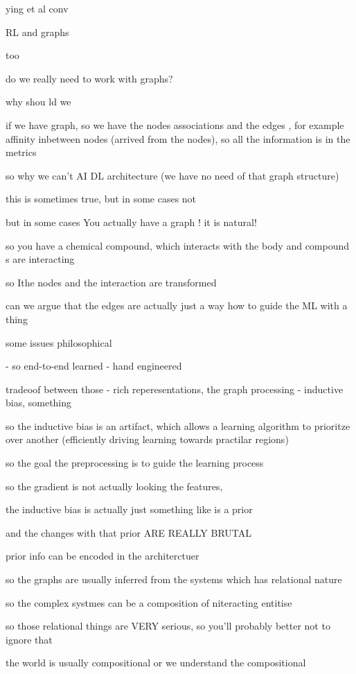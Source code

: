 \documentclass{article}
\begin{document}
ying et al conv

RL and graphs

too

do we really need to work with graphs?

why shou ld we

if we have  graph, so we have the nodes associations and the edges , for example affinity inbetween nodes (arrived from the nodes), so all the information is in the metrics



so why we can't AI DL architecture (we have no need of that graph structure)

this is sometimes true, but in some cases  not

but in some cases You actually have a graph ! it is natural!

so you have a chemical compound, which interacts with the body and compound s are interacting

so Ithe nodes and the interaction are transformed

can we argue that the edges are actually just a way how to guide the ML with a thing


some issues philosophical

- so end-to-end learned
- hand engineered

tradeoof between those
- rich reperesentations, the graph processing
- inductive bias, something


so the inductive bias is an artifact, which allows a learning algorithm to prioritze over another (efficiently driving learning towards practilar regions)

so the goal the preprocessing is to guide the learning process

so the gradient is not actually looking the features, 

the inductive bias is actually just something like is a prior

and the changes with that prior ARE REALLY BRUTAL



prior info can be encoded in the architerctuer


so the graphs are usually inferred from the systems which has relational nature

so the complex systmes can be a composition of niteracting entitise

so those relational things are VERY serious, so you'll probably better not to ignore that

the world is usually compositional or we understand the compositional
\end{document}

